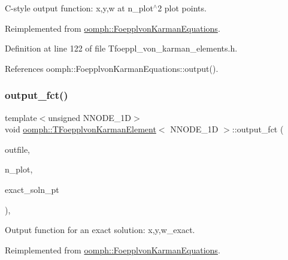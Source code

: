 C-\/style output function\+: x,y,w at n\+\_\+plot$^\wedge$2 plot points. 



Reimplemented from \hyperlink{classoomph_1_1FoepplvonKarmanEquations_a9972ef429bbcf53c733c6798dd68271a}{oomph\+::\+Foepplvon\+Karman\+Equations}.



Definition at line 122 of file Tfoeppl\+\_\+von\+\_\+karman\+\_\+elements.\+h.



References oomph\+::\+Foepplvon\+Karman\+Equations\+::output().

\mbox{\label{classoomph_1_1TFoepplvonKarmanElement_a8b321da1c5d766fc40ee502b82c6f47d}} 
\subsubsection{\texorpdfstring{output\+\_\+fct()}{output\_fct()}\hspace{0.1cm}{\footnotesize\ttfamily [1/2]}}
{\footnotesize\ttfamily template$<$unsigned N\+N\+O\+D\+E\+\_\+1D$>$ \\
void \hyperlink{classoomph_1_1TFoepplvonKarmanElement}{oomph\+::\+T\+Foepplvon\+Karman\+Element}$<$ N\+N\+O\+D\+E\+\_\+1D $>$\+::output\+\_\+fct (\begin{DoxyParamCaption}\item[{std\+::ostream \&}]{outfile,  }\item[{const unsigned \&}]{n\+\_\+plot,  }\item[{\hyperlink{classoomph_1_1FiniteElement_a690fd33af26cc3e84f39bba6d5a85202}{Finite\+Element\+::\+Steady\+Exact\+Solution\+Fct\+Pt}}]{exact\+\_\+soln\+\_\+pt }\end{DoxyParamCaption})\hspace{0.3cm}{\ttfamily [inline]}, {\ttfamily [virtual]}}



Output function for an exact solution\+: x,y,w\+\_\+exact. 



Reimplemented from \hyperlink{classoomph_1_1FoepplvonKarmanEquations_a2e926381021b99050cebb69a07867ebc}{oomph\+::\+Foepplvon\+Karman\+Equations}.



